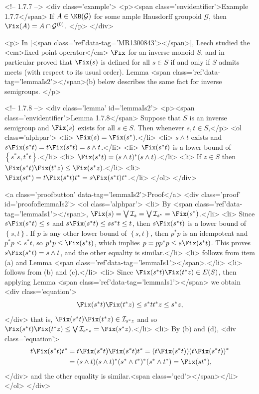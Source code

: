 <!-- 1.7.7 -->
<div class='example'>
	<p><span class='envidentifier'>Example 1.7.7</span>
	If $A\in\KB(\mathcal{G})$ for some ample Hausdorff groupoid $\mathcal{G}$, then $\Fix(A)=A\cap\mathcal{G}^{(0)}$.
	</p>
</div>

<p>
In [<span class='ref'data-tag='MR1300843'></span>], Leech studied the <em>fixed point operator</em> $\Fix$ for an inverse monoid $S$, and in particular proved that $\Fix(s)$ is defined for all $s\in S$ if and only if $S$ admits meets (with respect to its usual order). Lemma <span class='ref'data-tag='lemmaIs2'></span>(b) below describes the same fact for inverse semigroups.
</p>

<!-- 1.7.8 -->
<div class='lemma' id='lemmaIs2'>
	<p><span class='envidentifier'>Lemma 1.7.8</span>
	Suppose that $S$ is an inverse semigroup and $\Fix(s)$ exists for all $s\in S$. Then whenever $s,t\in S$,</p>
	<ol class='alphpar'>
		<li> $\Fix(s)=\Fix(s^*)$.</li>
		<li> $s\land t$ exists and $s\Fix(s^*t)=t\Fix(s^*t)=s\land t$.</li>
		<li> $\Fix(s^*t)$ is a lower bound of $\left\{s^*s,t^*t\right\}$.</li>
		<li> $\Fix(s^*t)=(s\land t)^*(s\land t)$.</li>
		<li> If $z\in S$ then $\Fix(s^*t)\Fix(t^*z)\leq\Fix(s^*z)$.</li>
		<li> $\Fix(st^*)=t\Fix(s^*t)t^*=s\Fix(s^*t)t^*$.</li>
	</ol>
</div>

<a class='proofbutton' data-tag='lemmaIs2'>Proof</a>
<div class='proof' id='proofoflemmaIs2'>
	<ol class='alphpar'>
		<li> By <span class='ref'data-tag='lemmaIs1'></span>, $\Fix(s)=\bigvee\mathcal{I}_s=\bigvee\mathcal{I}_{s^*}=\Fix(s^*)$.</li>
		<li> Since $s\Fix(s^*t)\leq s$ and $s\Fix(s^*t)\leq ss^*t\leq t$, then $s\Fix(s^*t)$ is a lower bound of $\left\{s,t\right\}$. If $p$ is any other lower bound of $\left\{s,t\right\}$, then $p^*p$ is an idempotent and $p^*p\leq s^*t$, so $p^*p\leq\Fix(s^*t)$, which implies $p=pp^*p\leq s\Fix(s^*t)$. This proves $s\Fix(s^*t)=s\land t$, and the other equality is similar.</li>
		<li> follows from item (a) and Lemma <span class='ref'data-tag='lemmaIs1'></span>.</li>
		<li> follows from (b) and (c).</li>
		<li> Since $\Fix(s^*t)\Fix(t^*z)\in E(S)$, then applying Lemma <span class='ref'data-tag='lemmaIs1'></span> we obtain
		<div class='equation'>\[
		\Fix(s^*t)\Fix(t^*z)\leq s^*tt^*z\leq s^*z,
		\]</div>
		that is, $\Fix(s^*t)\Fix(t^*z)\in\mathcal{I}_{s^*z}$ and so $\Fix(s^*t)\Fix(t^*z)\leq\bigvee\mathcal{I}_{s^*z}=\Fix(s^*z)$.</li>
		<li> By (b) and (d),
		<div class='equation'>\begin{align*}
		t\Fix(s^*t)t^*&=t\Fix(s^*t)\Fix(s^*t)t^*=(t\Fix(s^*t))(t\Fix(s^*t))^*\\
		&=(s\land t)(s\land t)^*(s^*\land t^*)^*(s^*\land t^*)=\Fix(st^*),
		\end{align*}</div>
		and the other equality is similar.<span class='qed'></span></li>
	</ol>
</div>

